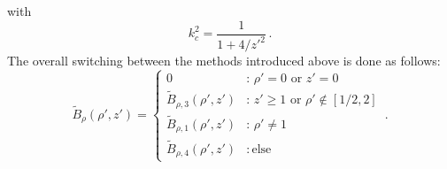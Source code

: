 with
\begin{equation}
  k_c^2 = \frac{1}{1 + 4/{z'}^2} \, .
\end{equation}
%
%
The overall switching between the methods introduced above is done as follows:
\begin{equation}
  \tilde{B}_\rho(\rho', z')
  = \begin{cases}
      0                                 &:\, \rho' = 0 \textrm{ or } z' = 0 \\
      \tilde{B}_{\rho,3} (\rho', z') &:\, z' \geq 1 \textrm{ or } \rho' \notin [1/2, 2] \\
      \tilde{B}_{\rho,1} (\rho', z') &:\, \rho' \neq 1         \\
      \tilde{B}_{\rho,4} (\rho', z') &:\, \textrm{else}
    \end{cases} \, .
\end{equation}

